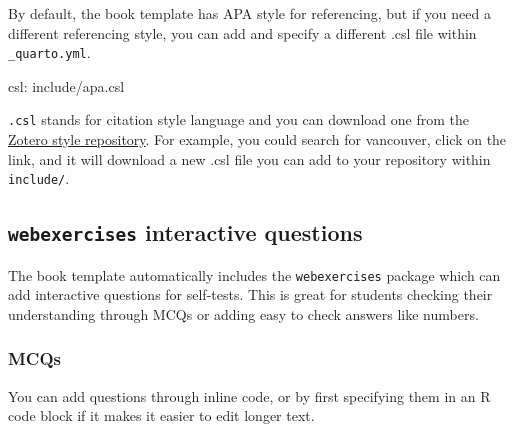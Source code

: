 \documentclass[
  letterpaper,
  DIV=11,
  numbers=noendperiod]{scrreprt}
\newenvironment{Shaded}{\begin{snugshade}}{\end{snugshade}}
\newcommand{\NormalTok}[1]{\textcolor[rgb]{0.00,0.23,0.31}{#1}}
\newcommand{\SpecialCharTok}[1]{\textcolor[rgb]{0.37,0.37,0.37}{#1}}
\begin{document}
By default, the book template has APA style for referencing, but if you
need a different referencing style, you can add and specify a different
.csl file within \texttt{\_quarto.yml}.

\begin{Shaded}
\begin{Highlighting}[]
\NormalTok{csl}\SpecialCharTok{:}\NormalTok{ include}\SpecialCharTok{/}\NormalTok{apa.csl}
\end{Highlighting}
\end{Shaded}

\begin{tcolorbox}[enhanced jigsaw, colbacktitle=quarto-callout-tip-color!10!white, titlerule=0mm, leftrule=.75mm, title=\textcolor{quarto-callout-tip-color}{\faLightbulb}\hspace{0.5em}{How do I specify a .csl file?}, breakable, bottomrule=.15mm, opacitybacktitle=0.6, rightrule=.15mm, opacityback=0, arc=.35mm, colframe=quarto-callout-tip-color-frame, toptitle=1mm, bottomtitle=1mm, toprule=.15mm, left=2mm, colback=white, coltitle=black]

\texttt{.csl} stands for citation style language and you can download
one from the \href{https://www.zotero.org/styles}{Zotero style
repository}. For example, you could search for vancouver, click on the
link, and it will download a new .csl file you can add to your
repository within \texttt{include/}.

\end{tcolorbox}

\subsection{\texorpdfstring{\texttt{webexercises} interactive
questions}{webexercises interactive questions}}\label{webexercises-interactive-questions}

The book template automatically includes the \texttt{webexercises}
package which can add interactive questions for self-tests. This is
great for students checking their understanding through MCQs or adding
easy to check answers like numbers.

\subsubsection{MCQs}\label{mcqs}

You can add questions through inline code, or by first specifying them
in an R code block if it makes it easier to edit longer text.
\end{document}
